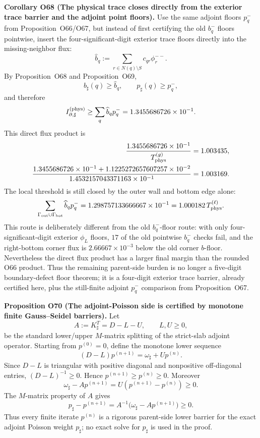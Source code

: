 \documentclass[aps,prd,onecolumn,notitlepage,nofootinbib,superscriptaddress,11pt,floatfix]{revtex4-2}
\begin{document}
\medskip\noindent\textbf{Corollary O68 (The physical trace closes directly from the exterior trace barrier and the adjoint point floors).}
Use the same adjoint floors \(p_q^-\) from Proposition~O66/O67, but instead of first certifying the old \(b_q^-\) floors pointwise, insert the four-significant-digit exterior trace floors directly into the missing-neighbor flux:
\[
\widehat b_q:=
\sum_{r\in N(q)\setminus S}c_{qr}\phi_r^{--}.
\]
By Proposition~O68 and Proposition~O69,
\[
b_\sharp(q)\ge\widehat b_q,
\qquad
p_\sharp(q)\ge p_q^-,
\]
and therefore
\[
I_{\partial,\sharp}^{(\rm phys)}
\ge
\sum_q \widehat b_q p_q^-
=1.3455686726\times10^{-1}.
\]
This direct flux product is
\[
\begin{aligned}
\frac{1.3455686726\times10^{-1}}{T_{\rm phys}^{(g)}}&=1.003435,\\
\frac{
1.3455686726\times10^{-1}+1.1225272657607257\times10^{-2}
}{
1.4532157043371163\times10^{-1}
}
&=1.003169.
\end{aligned}
\]
The local threshold is still closed by the outer wall and bottom edge alone:
\[
\sum_{\Gamma_{\rm out}\cup\Gamma_{\rm bot}}\widehat b_qp_q^-
=1.298757133666667\times10^{-1}
=1.000182\,T_{\rm phys}^{(\ell)}.
\]
This route is deliberately different from the old \(b_q^-\)-floor route: with only four-significant-digit exterior \(\phi_L\) floors, \(17\) of the old pointwise \(b_q^-\) checks fail, and the right-bottom corner flux is \(2.66667\times10^{-3}\) below the old corner \(b\)-floor.  Nevertheless the direct flux product has a larger final margin than the rounded O66 product.  Thus the remaining parent-side burden is no longer a five-digit boundary-defect floor theorem; it is a four-digit exterior trace barrier, already certified here, plus the still-finite adjoint \(p_q^-\) comparison from Proposition~O67.

\medskip\noindent\textbf{Proposition O70 (The adjoint-Poisson side is certified by monotone finite Gauss--Seidel barriers).}
Let
\[
A:=K_\sharp^T=D-L-U,
\qquad
L,U\ge0,
\]
be the standard lower/upper \(M\)-matrix splitting of the strict-slab adjoint operator.  Starting from \(p^{(0)}=0\), define the monotone lower sequence
\[
(D-L)p^{(n+1)}=\omega_\sharp+U p^{(n)}.
\]
Since \(D-L\) is triangular with positive diagonal and nonpositive off-diagonal entries, \((D-L)^{-1}\ge0\).  Hence \(p^{(n+1)}\ge p^{(n)}\ge0\).  Moreover
\[
\omega_\sharp-Ap^{(n+1)}
=U(p^{(n+1)}-p^{(n)})\ge0.
\]
The \(M\)-matrix property of \(A\) gives
\[
p_\sharp-p^{(n+1)}
=A^{-1}\bigl(\omega_\sharp-Ap^{(n+1)}\bigr)\ge0.
\]
Thus every finite iterate \(p^{(n)}\) is a rigorous parent-side lower barrier for the exact adjoint Poisson weight \(p_\sharp\); no exact solve for \(p_\sharp\) is used in the proof.
\end{document}
